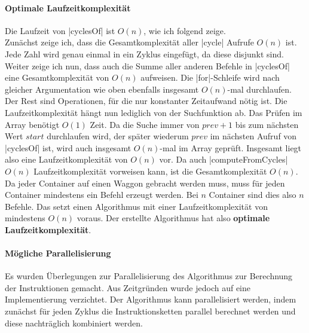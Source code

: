 \paragraph{Optimale Laufzeitkomplexität}
Die Laufzeit von |cyclesOf| ist $O(n)$, wie ich folgend zeige.\\
Zunächst zeige ich, dass die Gesamtkomplexität aller |cycle| Aufrufe $O(n)$ ist.
Jede Zahl wird genau einmal in ein Zyklus eingefügt, da diese disjunkt sind.
Weiter zeige ich nun, dass auch die Summe aller anderen Befehle in |cyclesOf| eine Gesamtkomplexität von $O(n)$ aufweisen.
Die |for|-Schleife wird nach gleicher Argumentation wie oben ebenfalls insgesamt $O(n)$-mal durchlaufen.
Der Rest sind Operationen, für die nur konstanter Zeitaufwand nötig ist. Die Laufzeitkomplexität hängt nun lediglich von der Suchfunktion ab.
Das Prüfen im Array benötigt $O(1)$ Zeit. Da die Suche immer von $prev+1$ bis zum nächsten Wert $start$ durchlaufen wird, der später wiederum $prev$ im nächsten Aufruf von |cyclesOf| ist,
wird auch insgesamt $O(n)$-mal im Array geprüft. Insgesamt liegt also eine Laufzeitkomplexität von $O(n)$ vor.
Da auch |computeFromCycles| $O(n)$ Laufzeitkomplexität vorweisen kann, ist die Gesamtkomplexität $O(n)$.\\
Da jeder Container auf einen Waggon gebracht werden muss, muss für jeden Container mindestens ein Befehl erzeugt werden.
Bei $n$ Container sind dies also $n$ Befehle. Das setzt einen Algorithmus mit einer Laufzeitkomplexität von mindestens $O(n)$ voraus.
Der erstellte Algorithmus hat also \textbf{optimale Laufzeitkomplexität}.

\paragraph{Mögliche Parallelisierung}
Es wurden Überlegungen zur Parallelisierung des Algorithmus zur Berechnung der Instruktionen gemacht.
Aus Zeitgründen wurde jedoch auf eine Implementierung verzichtet.
Der Algorithmus kann parallelisiert werden,
indem zunächst für jeden Zyklus die Instruktionsketten parallel berechnet werden und diese nachträglich kombiniert werden.

